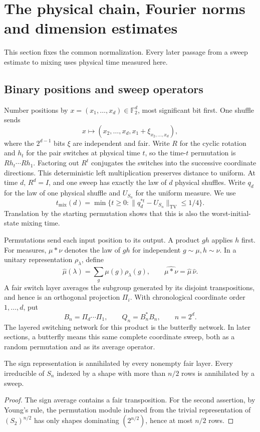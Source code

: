 \section{The physical chain, Fourier norms and dimension estimates}\label{sec:prelim}
This section fixes the common normalization. Every later passage from a sweep estimate to mixing uses physical time measured here.

\subsection{Binary positions and sweep operators}
Number positions by $x=(x_1,\ldots,x_d)\in\mathbb F_2^d$, most significant bit first. One shuffle sends
\[
 x\longmapsto(x_2,\ldots,x_d,x_1+\xi_{x_2,\ldots,x_d}),
\]
where the $2^{d-1}$ bits $\xi$ are independent and fair. Write $R$ for the cyclic rotation and $h_t$ for the pair switches at physical time $t$, so the time-$t$ permutation is $Rh_t\cdots Rh_1$. Factoring out $R^t$ conjugates the switches into the successive coordinate directions. This deterministic left multiplication preserves distance to uniform. At time $d$, $R^d=I$, and one sweep has exactly the law of $d$ physical shuffles. Write $q_d$ for the law of one physical shuffle and
$U_{S_n}$ for the uniform measure. We use
\[
 t_{\mathrm{mix}}(d)=\min\{t\ge0:
       \|q_d^{*t}-U_{S_n}\|_{\mathrm{TV}}\le1/4\}.
\]
Translation by the starting permutation shows that this is also the
worst-initial-state mixing time.

Permutations send each input position to its output. A product $gh$ applies $h$ first. For measures, $\mu*\nu$ denotes the law of $gh$ for independent $g\sim\mu,h\sim\nu$. In a unitary representation $\rho_\lambda$, define
\[
 \widehat\mu(\lambda)=\sum_g\mu(g)\rho_\lambda(g),
 \qquad\widehat{\mu*\nu}=\widehat\mu\,\widehat\nu.
\]
A fair switch layer averages the subgroup generated by its disjoint transpositions, and hence is an orthogonal projection $\Pi_i$. With chronological coordinate order $1,\ldots,d$, put
\[
 B_n=\Pi_d\cdots\Pi_1,\qquad Q_n=B_n^*B_n,
 \qquad n=2^d.
\]
The layered switching network for this product is the butterfly network.
In later sections, a butterfly means this same complete coordinate sweep,
both as a random permutation and as its average operator.
\begin{lemma}\label{lem:annihilation}
The sign representation is annihilated by every nonempty fair layer. Every irreducible of $S_n$ indexed by a shape with more than $n/2$ rows is annihilated by a sweep.
\end{lemma}\begin{proof}
The sign average contains a fair transposition. For the second assertion, by Young's rule, the permutation module induced from the trivial representation of $(S_2)^{n/2}$ has only shapes dominating $(2^{n/2})$, hence at most $n/2$ rows.
\end{proof}

